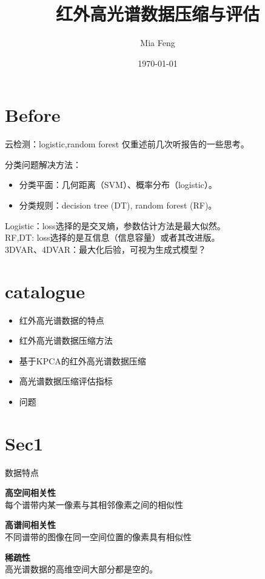 \documentclass[aspectratio=43]{beamer}
\title{红外高光谱数据压缩与评估}
\date{\today}
\author[Feng]{Mia Feng}
\begin{document}
\begin{frame}
\titlepage
\end{frame}

\section{Before}
\begin{frame}{云检测：logistic,random forest}
仅重述前几次听报告的一些思考。
\begin{cardTiny}
分类问题解决方法：
\begin{itemize}
\item 分类平面：几何距离（SVM）、概率分布（logistic）。
\item 分类规则：decision tree (DT), random forest (RF)。
\end{itemize}
\end{cardTiny}
\centering
{}
\begin{cardTiny}
Logistic：loss选择的是交叉熵，参数估计方法是最大似然。\\
RF,DT: loss选择的是互信息（信息容量）或者其改进版。\\
3DVAR、4DVAR：最大化后验，可视为{\color{green}生成式模型？}
\end{cardTiny}
\end{frame}


\section{catalogue}
\begin{frame}
\begin{card}[目录]
\begin{itemize}
\item 红外高光谱数据的特点
\item 红外高光谱数据压缩方法
\item 基于KPCA的红外高光谱数据压缩
\item 高光谱数据压缩评估指标
\item 问题
\end{itemize}
\end{card}
\end{frame}


\section{Sec1}
\begin{frame}{数据特点}
\begin{card}
\textbf{高空间相关性} \\[2mm]
每个谱带内某一像素与其{\color{primary}相邻像素}之间的相似性
\end{card}
\begin{card}
\textbf{高谱间相关性}\\ [2mm]
{\color{primary}不同谱带}的图像在同一空间位置的像素具有相似性
\end{card}
\begin{card}
\textbf{稀疏性}\\ [2mm]
高光谱数据的高维空间大部分都是空的。
\end{card}
\end{frame}
\end{document}
